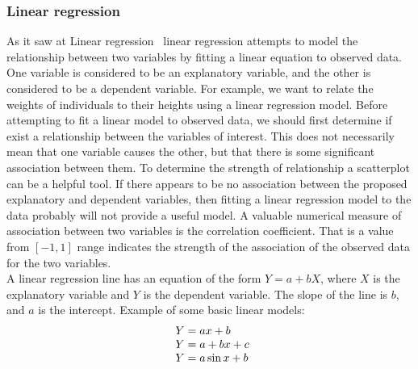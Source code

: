\subsubsection{Linear regression} \label{sec:linear}
As it saw at Linear regression~\cite{linear} linear regression attempts to model the relationship between two variables by fitting a linear equation to observed data.
One variable is considered to be an explanatory variable, and the other is considered to be a dependent variable.
For example, we want to relate the weights of individuals to their heights using a linear regression model.
Before attempting to fit a linear model to observed data, we should first determine if exist a relationship between the variables of interest.
This does not necessarily mean that one variable causes the other, but that there is some significant association between them.
To determine the strength of relationship a scatterplot can be a helpful tool.
If there appears to be no association between the proposed explanatory and dependent variables, then fitting a linear regression
model to the data probably will not provide a useful model.
A valuable numerical measure of association between two variables is the correlation coefficient.
That is a value from $[-1, 1]$ range indicates the strength of the association of the observed data for the two variables.\\
A linear regression line has an equation of the form $Y = a + bX$, where $X$ is the explanatory variable and $Y$ is the dependent variable.
The slope of the line is $b$, and $a$ is the intercept.
Example of some basic linear models:\\
\begin{equation} \label{eq:4}
\begin{array}{l@{}l}
	Y = ax + b\\
	Y = a + bx + c\\
	Y = a\sin x + b\\
\end{array}
\end{equation}

